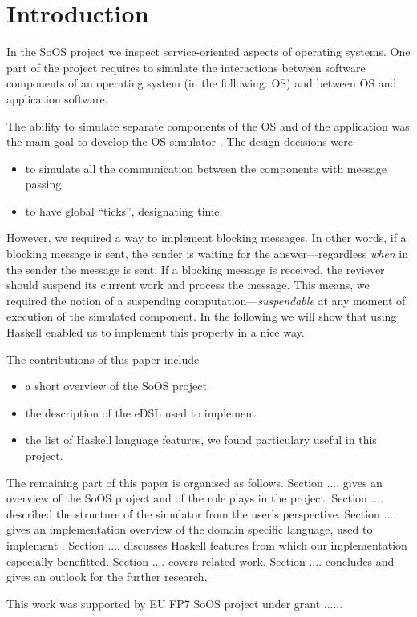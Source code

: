 \section{Introduction}

In the SoOS project we inspect service-oriented aspects of operating
systems. One part of the project requires to simulate the interactions
between software components of an operating system (in the following:
OS) and between OS and application software.

The ability to simulate separate components of the OS and of the
application was the main goal to develop the OS simulator \soosim. The
design decisions were 
\begin{itemize}
\item to simulate all the communication between the components with
  message passing
\item to have global ``ticks'', designating time.
\end{itemize}
However, we required a way to implement blocking messages. In other
words, if a blocking message is sent, the sender is waiting for the
answer---regardless \emph{when} in the sender the message is sent. If
a blocking message is received, the reviever should suspend its
current work and process the message. This
means, we required the notion of a suspending
computation---\emph{suspendable} at any moment of execution of the
simulated component. In the following we will show that using Haskell
enabled us to implement this property in a nice way.

The contributions of this paper include
\begin{itemize}
\item a short overview of the SoOS project
\item the description of the eDSL used to implement \soosim 
\item the list of Haskell language features, we found particulary
  useful in this project.
\end{itemize}

The remaining part of this paper is organised as follows. Section
.... gives an overview of the SoOS project and of the role \soosim
plays in the project. Section .... described the structure of the
\soosim simulator from the user's perspective. Section .... gives an
implementation overview of the domain specific language, used to
implement \soosim. Section .... discusses Haskell features from which
our implementation especially benefitted. Section .... covers related
work. Section .... concludes and gives an outlook for the further
research.

%

\acks

This work was supported by EU FP7 SoOS project under grant ......
